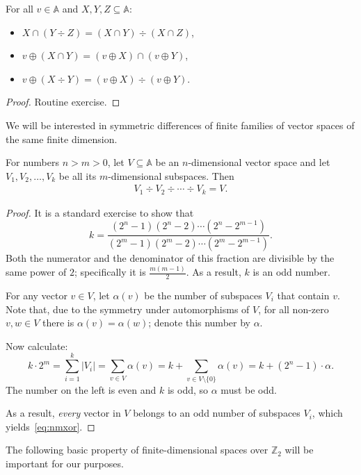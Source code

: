 \documentclass[10pt,a4paper]{amsart}
\numberwithin{equation}{section}
\newcommand{\Z}{{\mathbb Z}}
\newcommand{\xor}{\div}
\newcommand{\atoms}{\mathbb A}
\begin{document}
\begin{lemma}\label{fact:vec-basic}
For all $v\in\atoms$ and $X,Y,Z\subseteq\atoms$:
\begin{itemize}
\item[(i)] $X\cap(Y\xor Z) = (X\cap Y)\xor (X\cap Z)$,\label{eq:cap-diff}
\item[(ii)] $v\oplus(X\cap Y) = (v\oplus X)\cap (v\oplus Y)$,\label{eq:oplus-cap}
\item[(iii)] $v\oplus(X\xor Y) = (v\oplus X)\xor(v\oplus Y)$.\label{eq:oplus-diff}
\end{itemize}
\end{lemma}
\begin{proof}Routine exercise.
\end{proof}

We will be interested in symmetric differences of finite families of vector spaces of the same finite dimension.

\begin{lemma}\label{lem:nmxor}
For numbers $n>m>0$, let $V\subseteq\atoms$ be an $n$-dimensional vector space and let 
$V_1,V_2,\ldots,V_k$ be all its $m$-dimensional subspaces. Then
\begin{align}\label{eq:nmxor}
	V_1\xor V_2\xor\cdots\xor V_k = V.
\end{align}
\end{lemma}
\begin{proof}
It is a standard exercise to show that
\[
	k = \dfrac{(2^n-1)(2^n-2)\cdots(2^n-2^{m-1})}{(2^m-1)(2^m-2)\cdots(2^m-2^{m-1})}.
\]
Both the numerator and the denominator of this fraction are divisible by the same power of $2$; specifically it is $\frac{m(m-1)}{2}$. As a result, $k$ is an odd number. 

For any vector $v\in V$, let $\alpha(v)$ be the number of subspaces $V_i$ that contain $v$. Note that, due to the symmetry under automorphisms of $V$, for all non-zero $v,w\in V$ there is $\alpha(v)=\alpha(w)$; denote this number by $\alpha$.

Now calculate:
\[
	k\cdot2^m = \sum_{i=1}^k|V_i| = \sum_{v\in V}\alpha(v) = k+\sum_{v\in V\setminus\{0\}}\alpha(v) = k+(2^n-1)\cdot\alpha.
\] 
The number on the left is even and $k$ is odd, so $\alpha$ must be odd.

As a result, {\em every} vector in $V$ belongs to an odd number of subspaces $V_i$, which yields~\eqref{eq:nmxor}.
\end{proof}

The following basic property of finite-dimensional spaces over $\Z_2$ will be important for our purposes.
\end{document}
